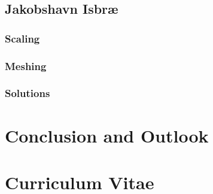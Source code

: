 \documentclass[a4paper,twoside,11pt,pdftex]{report}
\begin{document}
\section{Jakobshavn Isbr{\ae}}\label{sec:jakobshavn}
\subsection{Scaling}\label{sec:vhtscaling}


\subsection{Meshing}\label{sec:jakomeshing}

\subsection{Solutions}\label{sec:jakosolutions}


\cleardoublepage

\chapter{Conclusion and Outlook}\label{chap:outlook}

\cleardoublepage



\cleardoublepage

\appendix

\pagestyle{plain}
\chapter*{Curriculum Vitae}

\end{document}
